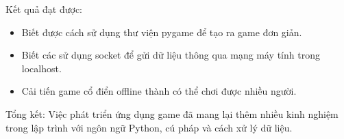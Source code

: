 \documentclass[a4paper]{article}
\begin{document}
Kết quả đạt được:
\begin{itemize}
    \item Biết được cách sử dụng thư viện pygame để tạo ra game đơn giản.
    \item Biết các sử dụng socket để gửi dữ liệu thông qua mạng máy tính trong localhost.
    \item Cải tiến game cổ điển offline thành có thể chơi được nhiều người.
\end{itemize}
Tổng kết: Việc phát triển ứng dụng game đã mang lại thêm nhiều kinh nghiệm trong lập trình với ngôn ngữ Python, cú pháp và cách xử lý dữ liệu.
\end{document}
